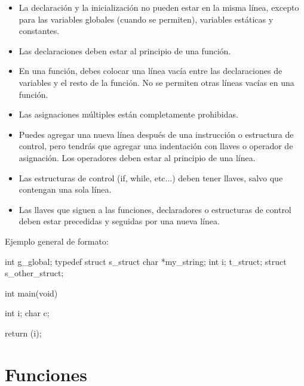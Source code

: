 \documentclass{42-es}
\begin{document}
\begin{itemize}
      \item La declaración y la inicialización no pueden estar en la misma
            línea,
            excepto para las variables globales (cuando se permiten), variables
            estáticas y
            constantes.
      \item Las declaraciones deben estar al principio de una función.
      \item En una función, debes colocar una línea vacía entre las
            declaraciones
            de variables y el resto de la función. No se permiten otras líneas
            vacías en una función.
      \item Las asignaciones múltiples están completamente prohibidas.
      \item Puedes agregar una nueva línea después de una instrucción o
            estructura
            de control, pero tendrás que agregar una indentación con llaves o
            operador de asignación. Los operadores deben estar al principio de
            una línea.
      \item Las estructuras de control (if, while, etc...) deben tener llaves,
            salvo que contengan una sola línea.
      \item Las llaves que siguen a las funciones, declaradores o estructuras
            de
            control deben estar precedidas y seguidas por una nueva línea.

\end{itemize}

Ejemplo general de formato:
\begin{42ccode}
      int	g_global;
      typedef struct	s_struct
      {
      char    *my_string;
      int     i;
      } 	t_struct;
      struct		s_other_struct;

      int main(void)
      {
                  int	  i;
                  char	  c;

                  return (i);
            }
\end{42ccode}
\newpage

\section{Funciones}
\end{document}
